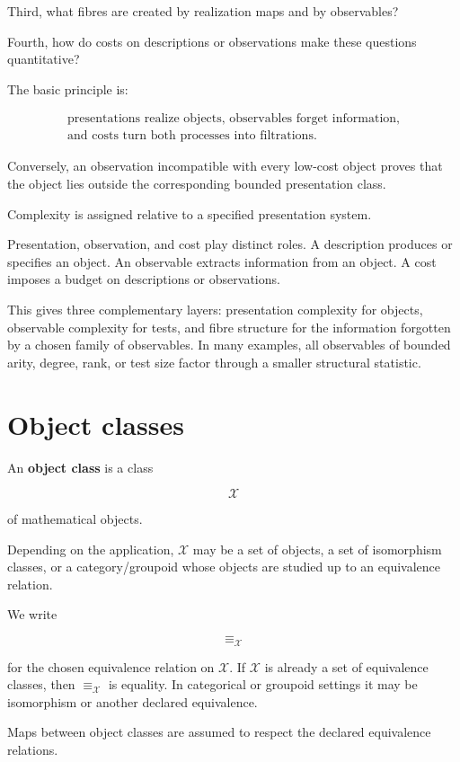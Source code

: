 \documentclass[11pt]{article}
\begin{document}
Third, what fibres are created by realization maps and by observables?

Fourth, how do costs on descriptions or observations make these questions quantitative?

The basic principle is:

\[
\begin{gathered}
\text{presentations realize objects, observables forget information,}\\
\text{and costs turn both processes into filtrations.}
\end{gathered}
\]

Conversely, an observation incompatible with every low-cost object proves that the object lies outside the corresponding bounded presentation class.

Complexity is assigned relative to a specified presentation system.

Presentation, observation, and cost play distinct roles. A description produces or specifies an object. An observable extracts information from an object. A cost imposes a budget on descriptions or observations.

This gives three complementary layers: presentation complexity for objects, observable complexity for tests, and fibre structure for the information forgotten by a chosen family of observables. In many examples, all observables of bounded arity, degree, rank, or test size factor through a smaller structural statistic.


\section{Object classes}

An \textbf{object class} is a class

\[
\mathcal X
\]

of mathematical objects.

Depending on the application, \(\mathcal X\) may be a set of objects, a set of isomorphism classes, or a category/groupoid whose objects are studied up to an equivalence relation.

We write

\[
\equiv_\mathcal X
\]

for the chosen equivalence relation on \(\mathcal X\). If \(\mathcal X\) is already a set of equivalence classes, then \(\equiv_\mathcal X\) is equality. In categorical or groupoid settings it may be isomorphism or another declared equivalence.

Maps between object classes are assumed to respect the declared equivalence relations.
\end{document}
